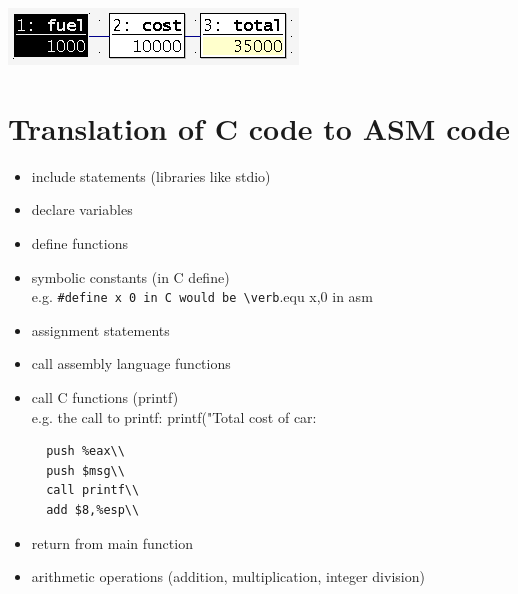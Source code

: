 \documentclass{article}
\begin{document}
\begin{center}
	\includegraphics{out1.png}
\end{center}

\clearpage
\section*{Translation of C code to ASM code}
\begin{itemize}
\item include statements (libraries like stdio)
\item declare variables
\item define functions
\item symbolic constants (in C define) \\
e.g. \verb|#define x 0 in C would be \verb|.equ x,0 in asm
\item assignment statements
\item call assembly language functions
\item call C functions (printf) \\
e.g. the call to printf: printf("Total cost of car: %
\begin{verbatim}  
  push %eax\\
  push $msg\\
  call printf\\
  add $8,%esp\\
\end{verbatim}
\item return from main function 
\item arithmetic operations (addition, multiplication, integer division)
\end{itemize}
\end{document}
